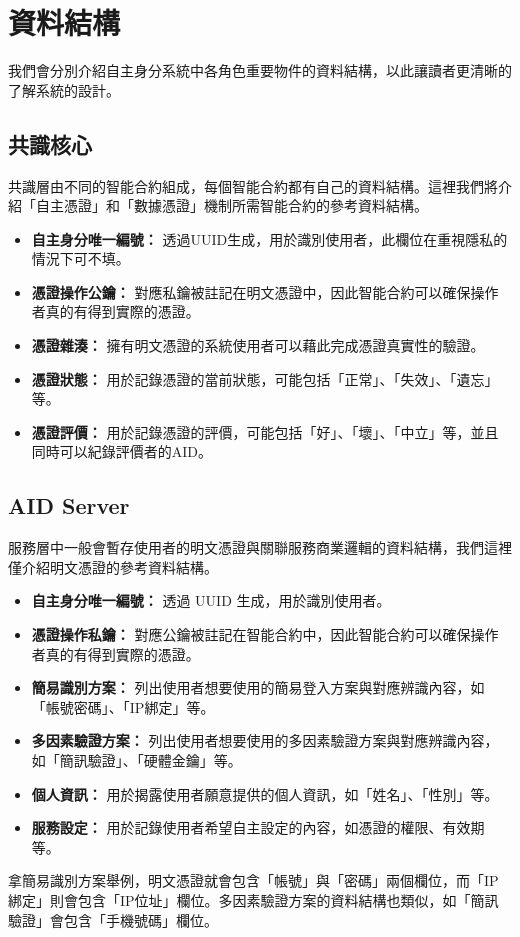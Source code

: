 \section{資料結構}
我們會分別介紹自主身分系統中各角色重要物件的資料結構，以此讓讀者更清晰的了解系統的設計。
\subsection{共識核心}
共識層由不同的智能合約組成，每個智能合約都有自己的資料結構。這裡我們將介紹「自主憑證」和「數據憑證」機制所需智能合約的參考資料結構。
\begin{itemize}
  \item \textbf{自主身分唯一編號：} 透過UUID生成，用於識別使用者，此欄位在重視隱私的情況下可不填。
  \item \textbf{憑證操作公鑰：} 對應私鑰被註記在明文憑證中，因此智能合約可以確保操作者真的有得到實際的憑證。
  \item \textbf{憑證雜湊：} 擁有明文憑證的系統使用者可以藉此完成憑證真實性的驗證。
  \item \textbf{憑證狀態：} 用於記錄憑證的當前狀態，可能包括「正常」、「失效」、「遺忘」等。
  \item \textbf{憑證評價：} 用於記錄憑證的評價，可能包括「好」、「壞」、「中立」等，並且同時可以紀錄評價者的AID。
\end{itemize}
\subsection{AID Server}
服務層中一般會暫存使用者的明文憑證與關聯服務商業邏輯的資料結構，我們這裡僅介紹明文憑證的參考資料結構。
\begin{itemize}
  \item \textbf{自主身分唯一編號：} 透過 UUID 生成，用於識別使用者。
  \item \textbf{憑證操作私鑰：} 對應公鑰被註記在智能合約中，因此智能合約可以確保操作者真的有得到實際的憑證。
  \item \textbf{簡易識別方案：} 列出使用者想要使用的簡易登入方案與對應辨識內容，如「帳號密碼」、「IP綁定」等。
  \item \textbf{多因素驗證方案：} 列出使用者想要使用的多因素驗證方案與對應辨識內容，如「簡訊驗證」、「硬體金鑰」等。
  \item \textbf{個人資訊：} 用於揭露使用者願意提供的個人資訊，如「姓名」、「性別」等。
  \item \textbf{服務設定：} 用於記錄使用者希望自主設定的內容，如憑證的權限、有效期等。
\end{itemize}
拿簡易識別方案舉例，明文憑證就會包含「帳號」與「密碼」兩個欄位，而「IP綁定」則會包含「IP位址」欄位。多因素驗證方案的資料結構也類似，如「簡訊驗證」會包含「手機號碼」欄位。

